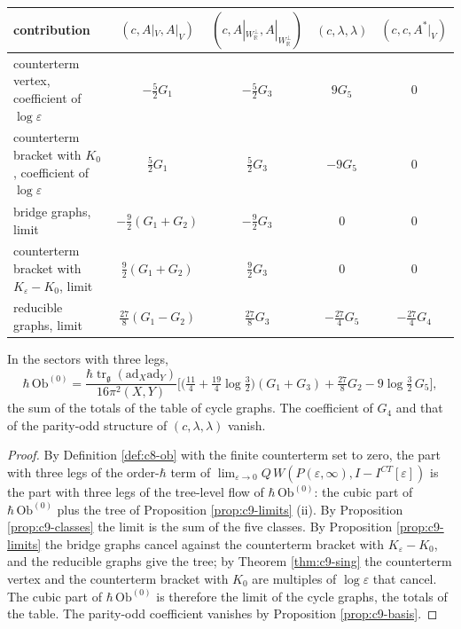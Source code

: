 \begin{tabular}{l|c|c|c|c}
contribution & $(c,A|_V,A|_V)$ & $(c,A|_{W_{\mathbb R}^\perp},A|_{W_{\mathbb R}^\perp})$ & $(c,\lambda,\lambda)$ & $(c,c,A^*|_V)$ \\
\hline
counterterm vertex, coefficient of $\log\varepsilon$ & $-\tfrac52G_1$ & $-\tfrac52G_3$ & $9G_5$ & $0$ \\
counterterm bracket with $K_0$, coefficient of $\log\varepsilon$ & $\tfrac52G_1$ & $\tfrac52G_3$ & $-9G_5$ & $0$ \\
bridge graphs, limit & $-\tfrac92(G_1+G_2)$ & $-\tfrac92G_3$ & $0$ & $0$ \\
counterterm bracket with $K_\varepsilon-K_0$, limit & $\tfrac92(G_1+G_2)$ & $\tfrac92G_3$ & $0$ & $0$ \\
reducible graphs, limit & $\tfrac{27}8(G_1-G_2)$ & $\tfrac{27}8G_3$ & $-\tfrac{27}4G_5$ & $-\tfrac{27}4G_4$ \\
\end{tabular}

\begin{theorem}
\label{thm:c9-ob3}
In the sectors with three legs,
\begin{equation}
\hbar\,\mathrm{Ob}^{(0)}=\frac{\hbar\operatorname{tr}_{\mathfrak g}(\mathrm{ad}_X\mathrm{ad}_Y)}{16\pi^2(X,Y)}\Big[\big(\tfrac{11}4+\tfrac{19}4\log\tfrac32\big)(G_1+G_3)+\tfrac{27}8G_2-9\log\tfrac32\,G_5\Big],
\label{eq:c9-ob3}
\end{equation}
the sum of the totals of the table of cycle graphs. The coefficient of $G_4$ and that of the parity-odd structure of $(c,\lambda,\lambda)$ vanish.
\end{theorem}

\begin{proof}
By Definition \ref{def:c8-ob} with the finite counterterm set to zero, the part with three legs of the order-$\hbar$ term of $\lim_{\varepsilon\to0}Q\,W(P(\varepsilon,\infty),I-I^{CT}[\varepsilon])$ is the part with three legs of the tree-level flow of $\hbar\,\mathrm{Ob}^{(0)}$: the cubic part of $\hbar\,\mathrm{Ob}^{(0)}$ plus the tree of Proposition \ref{prop:c9-limits} (ii). By Proposition \ref{prop:c9-classes} the limit is the sum of the five classes. By Proposition \ref{prop:c9-limits} the bridge graphs cancel against the counterterm bracket with $K_\varepsilon-K_0$, and the reducible graphs give the tree; by Theorem \ref{thm:c9-sing} the counterterm vertex and the counterterm bracket with $K_0$ are multiples of $\log\varepsilon$ that cancel. The cubic part of $\hbar\,\mathrm{Ob}^{(0)}$ is therefore the limit of the cycle graphs, the totals of the table. The parity-odd coefficient vanishes by Proposition \ref{prop:c9-basis}.
\end{proof}

